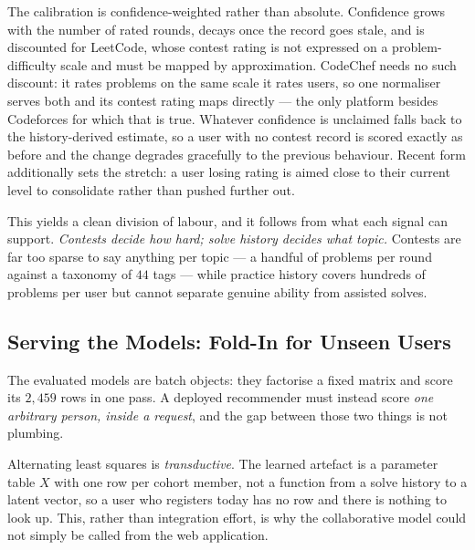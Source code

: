 \documentclass[12pt,a4paper]{article}
\begin{document}
The calibration is confidence-weighted rather than absolute. Confidence grows with the
number of rated rounds, decays once the record goes stale, and is discounted for
LeetCode, whose contest rating is not expressed on a problem-difficulty scale and must
be mapped by approximation. CodeChef needs no such discount: it rates problems on the
same scale it rates users, so one normaliser serves both and its contest rating maps
directly --- the only platform besides Codeforces for which that is true. Whatever confidence is unclaimed falls back to the
history-derived estimate, so a user with no contest record is scored exactly as before
and the change degrades gracefully to the previous behaviour. Recent form additionally
sets the stretch: a user losing rating is aimed close to their current level to
consolidate rather than pushed further out.

This yields a clean division of labour, and it follows from what each signal can
support. \emph{Contests decide how hard; solve history decides what topic.} Contests are
far too sparse to say anything per topic --- a handful of problems per round against a
taxonomy of $44$ tags --- while practice history covers hundreds of problems per user but
cannot separate genuine ability from assisted solves.

\subsection{Serving the Models: Fold-In for Unseen Users}
\label{sec:serving}
The evaluated models are batch objects: they factorise a fixed matrix and score its
$2{,}459$ rows in one pass. A deployed recommender must instead score \emph{one arbitrary
person, inside a request}, and the gap between those two things is not plumbing.

Alternating least squares is \emph{transductive}. The learned artefact is a parameter
table $X$ with one row per cohort member, not a function from a solve history to a
latent vector, so a user who registers today has no row and there is nothing to look
up. This, rather than integration effort, is why the collaborative model could not
simply be called from the web application.
\end{document}

